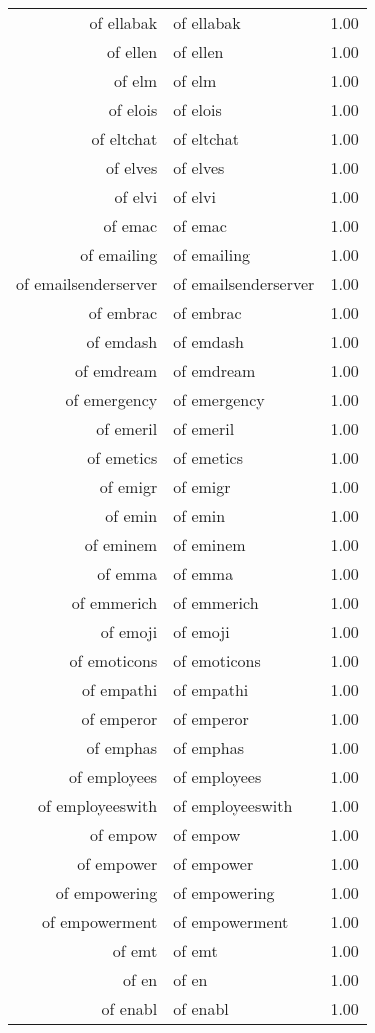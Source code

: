 \begin{table}[ht]
\begin{tabular}{rlr}
  of ellabak & of ellabak & 1.00 \\ 
  of ellen & of ellen & 1.00 \\ 
  of elm & of elm & 1.00 \\ 
  of elois & of elois & 1.00 \\ 
  of eltchat & of eltchat & 1.00 \\ 
  of elves & of elves & 1.00 \\ 
  of elvi & of elvi & 1.00 \\ 
  of emac & of emac & 1.00 \\ 
  of emailing & of emailing & 1.00 \\ 
  of emailsenderserver & of emailsenderserver & 1.00 \\ 
  of embrac & of embrac & 1.00 \\ 
  of emdash & of emdash & 1.00 \\ 
  of emdream & of emdream & 1.00 \\ 
  of emergency & of emergency & 1.00 \\ 
  of emeril & of emeril & 1.00 \\ 
  of emetics & of emetics & 1.00 \\ 
  of emigr & of emigr & 1.00 \\ 
  of emin & of emin & 1.00 \\ 
  of eminem & of eminem & 1.00 \\ 
  of emma & of emma & 1.00 \\ 
  of emmerich & of emmerich & 1.00 \\ 
  of emoji & of emoji & 1.00 \\ 
  of emoticons & of emoticons & 1.00 \\ 
  of empathi & of empathi & 1.00 \\ 
  of emperor & of emperor & 1.00 \\ 
  of emphas & of emphas & 1.00 \\ 
  of employees & of employees & 1.00 \\ 
  of employeeswith & of employeeswith & 1.00 \\ 
  of empow & of empow & 1.00 \\ 
  of empower & of empower & 1.00 \\ 
  of empowering & of empowering & 1.00 \\ 
  of empowerment & of empowerment & 1.00 \\ 
  of emt & of emt & 1.00 \\ 
  of en & of en & 1.00 \\ 
  of enabl & of enabl & 1.00 \\ 

\end{tabular}
\end{table}
